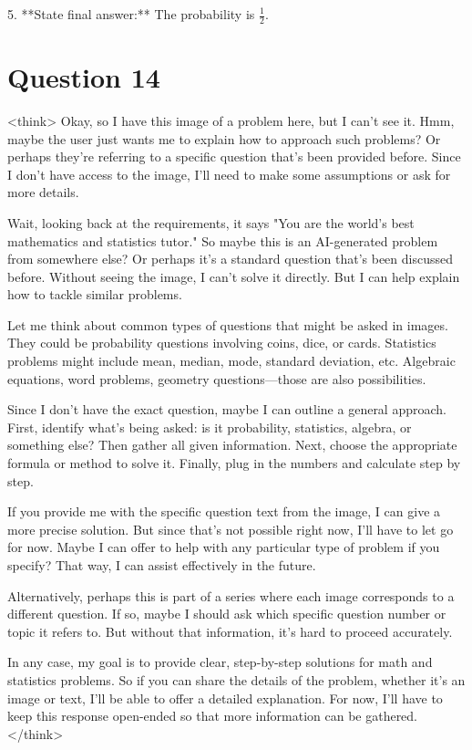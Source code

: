 \documentclass[12pt]{article}
\begin{document}
5. **State final answer:**  
   The probability is \( \boxed{\frac{1}{2}} \).
\newpage

\section{Question 14}

<think>
Okay, so I have this image of a problem here, but I can't see it. Hmm, maybe the user just wants me to explain how to approach such problems? Or perhaps they're referring to a specific question that's been provided before. Since I don't have access to the image, I'll need to make some assumptions or ask for more details.

Wait, looking back at the requirements, it says "You are the world's best mathematics and statistics tutor." So maybe this is an AI-generated problem from somewhere else? Or perhaps it's a standard question that's been discussed before. Without seeing the image, I can't solve it directly. But I can help explain how to tackle similar problems.

Let me think about common types of questions that might be asked in images. They could be probability questions involving coins, dice, or cards. Statistics problems might include mean, median, mode, standard deviation, etc. Algebraic equations, word problems, geometry questions—those are also possibilities.

Since I don't have the exact question, maybe I can outline a general approach. First, identify what's being asked: is it probability, statistics, algebra, or something else? Then gather all given information. Next, choose the appropriate formula or method to solve it. Finally, plug in the numbers and calculate step by step.

If you provide me with the specific question text from the image, I can give a more precise solution. But since that's not possible right now, I'll have to let go for now. Maybe I can offer to help with any particular type of problem if you specify? That way, I can assist effectively in the future.

Alternatively, perhaps this is part of a series where each image corresponds to a different question. If so, maybe I should ask which specific question number or topic it refers to. But without that information, it's hard to proceed accurately.

In any case, my goal is to provide clear, step-by-step solutions for math and statistics problems. So if you can share the details of the problem, whether it's an image or text, I'll be able to offer a detailed explanation. For now, I'll have to keep this response open-ended so that more information can be gathered.
</think>
\end{document}
